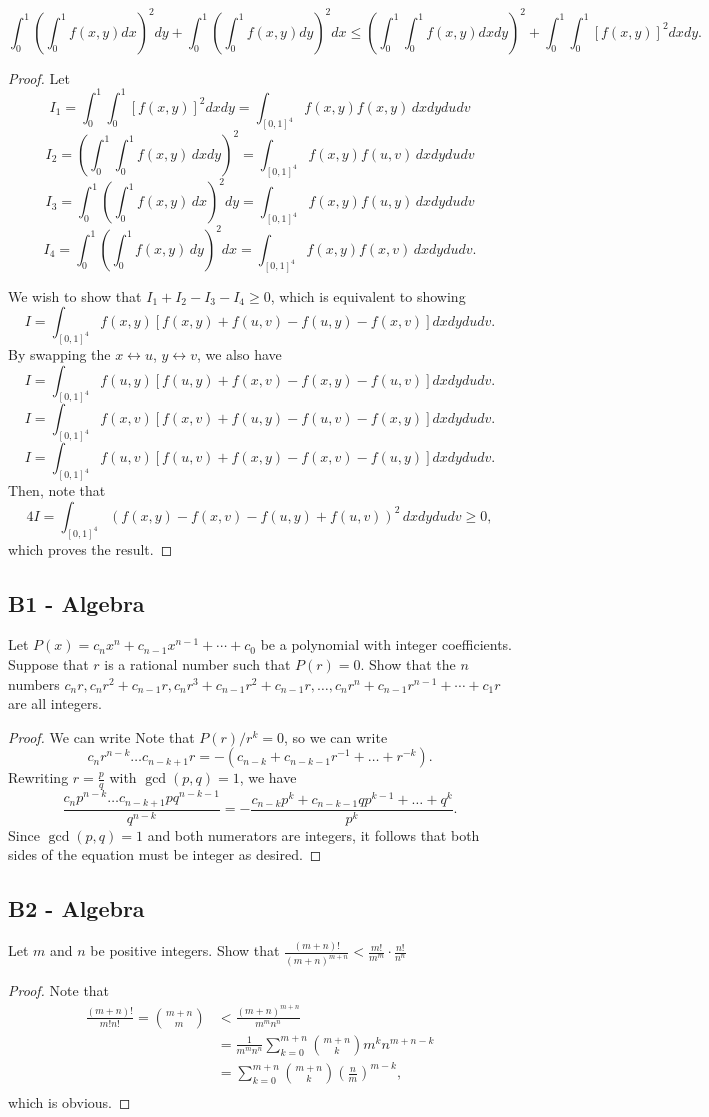 \documentclass[11pt]{scrartcl}
\newcommand{\<}{\langle}
\renewcommand{\>}{\rangle}
\begin{document}
$$\int_0^1\left(\int_0^1f(x,y)dx\right)^2dy + \int_0^1\left(\int_0^1f(x,y)dy\right)^2dx\le\left(\int_0^1\int_0^1f(x,y)dxdy\right)^2 + \int_0^1\int_0^1\left[f(x,y)\right]^2dxdy.$$
\begin{proof}
Let 
$$I_1 = \int_0^1\int_0^1\left[f(x,y)\right]^2dxdy = \int_{[0, 1]^4} f(x, y) f(x, y) \,dx dy du dv$$
$$I_2 = \left ( \int_0^1\int_0^1f(x,y)\,dxdy \right)^2 = \int_{[0, 1]^4} f(x, y) f(u, v) \,dx dy du dv$$
$$I_3 =   \int_0^1 \left (\int_0^1f(x,y)\,dx\right)^2dy = \int_{[0, 1]^4} f(x, y) f(u, y) \,dx dy du dv$$
$$I_4 =   \int_0^1 \left (\int_0^1f(x,y)\,dy\right)^2dx = \int_{[0, 1]^4} f(x, y) f(x, v) \,dx dy du dv.$$

We wish to show that $I_1 + I_2 - I_3 - I_4 \ge 0$, which is equivalent to showing 
$$I = \int_{[0, 1]^4} f(x, y) \left [f(x, y) + f(u, v) - f(u, y) - f(x, v) \right]dxdydudv.$$
By swapping the $x \leftrightarrow u$, $y \leftrightarrow v$, we also have 
$$I = \int_{[0, 1]^4} f(u, y) \left [f(u, y) + f(x, v) - f(x, y) - f(u, v) \right]dxdydudv.$$
$$I = \int_{[0, 1]^4} f(x, v) \left [f(x, v) + f(u, y) - f(u, v) - f(x, y) \right]dxdydudv.$$
$$I = \int_{[0, 1]^4} f(u, v) \left [f(u, v) + f(x, y) - f(x, v) - f(u, y) \right]dxdydudv.$$
Then, note that 
$$4I =  \int_{[0, 1]^4} \left (f(x, y) - f(x, v) - f(u, y) + f(u, v) \right)^2 \,dxdydudv \ge 0,$$
which proves the result.  
\end{proof}
\subsection{B1 - Algebra}
Let $P(x)=c_nx^n+c_{n-1}x^{n-1}+\cdots+c_0$ be a polynomial with integer coefficients. Suppose that $r$ is a rational number such that $P(r)=0$. Show that the $n$ numbers
$c_nr, c_nr^2+c_{n-1}r, c_nr^3+c_{n-1}r^2+c_{n-1}r, \dots, c_nr^n+c_{n-1}r^{n-1}+\cdots+c_1r$
are all integers.
\begin{proof}
We can write Note that $P(r)/r^{k} = 0$, so we can write
$$c_n r^{n-k} \dots c_{n-k+1}r = - (c_{n-k}  + c_{n-k-1}r^{-1} + \dots + r^{-k}).$$
Rewriting $r = \frac{p}{q}$ with $\gcd(p, q) = 1$, we have
$$\frac{c_n p^{n-k} \dots c_{n-k+1}pq^{n-k-1}}{q^{n-k}} = - \frac{c_{n-k}p^k  + c_{n-k-1}q p^{k-1} + \dots + q^k}{p^k}.$$
Since $\gcd(p, q) = 1$ and both numerators are integers, it follows that both sides of the equation must be integer as desired.
\end{proof}
\subsection{B2 - Algebra}
Let $m$ and $n$ be positive integers. Show that
$\frac{(m+n)!}{(m+n)^{m+n}} < \frac{m!}{m^m}\cdot\frac{n!}{n^n}$
\begin{proof}
Note that
\begin{align*}
\frac{(m+n)!}{m!n!} = \binom{m+n}{m} &< \frac{(m+n)^{m+n}}{m^mn^n}  \\
&= \frac{1}{m^mn^n} \sum_{k=0}^{m+n} \binom{m+n}{k} m^k n^{m+n-k} \\
&=  \sum_{k=0}^{m+n} \binom{m+n}{k} \left( \frac{n}{m}\right)^{m-k},\\
\end{align*}
which is obvious.
\end{proof}
\end{document}

